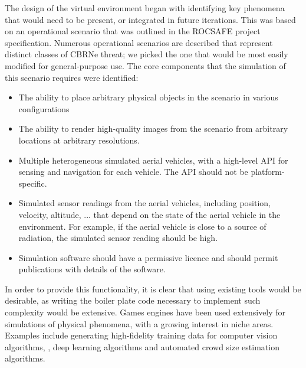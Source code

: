 The design of the virtual environment began with identifying key phenomena that would need to be present, or integrated in future iterations. This was based on an operational scenario that was outlined in the ROCSAFE project specification\cite{rocsafeNUIG}. Numerous operational scenarios are described that represent distinct classes of CBRNe threat; we picked the one that would be most easily modified for general-purpose use. The core components that the simulation of this scenario requires were identified: 
\begin{itemize}
    \item The ability to place arbitrary physical objects in the scenario in various configurations
    \item The ability to render high-quality images from the scenario from arbitrary locations at arbitrary resolutions.
    \item Multiple heterogeneous simulated aerial vehicles, with a high-level API for sensing and navigation for each vehicle. The API should not be platform-specific.
    \item Simulated sensor readings from the aerial vehicles, including position, velocity, altitude, ... that depend on the state of the aerial vehicle in the environment. For example, if the aerial vehicle is close to a source of radiation, the simulated sensor reading should be high.
    \item Simulation software should have a permissive licence and should permit publications with details of the software.
\end{itemize}
In order to provide this functionality, it is clear that using existing tools would be desirable, as writing the boiler plate code necessary to implement such complexity would be extensive. Games engines have been used extensively for simulations of physical phenomena, with a growing interest in niche areas. Examples include generating high-fidelity training data for computer vision algorithms, \cite{QiuUnrealCV:Engine}, deep learning algorithms\cite{GaidonVirtualAnalysis} and automated crowd size estimation algorithms\cite{Lee2018DigitalCrowds}.\par

